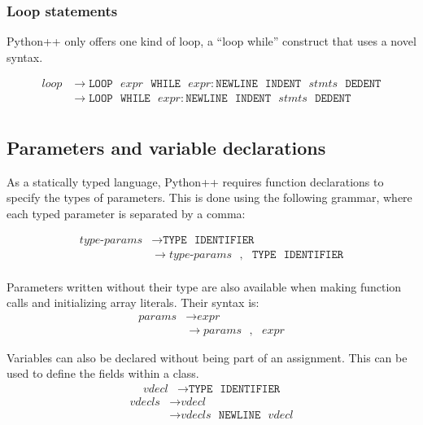 \documentclass{article}
\begin{document}
\subsubsection{Loop statements}
Python++ only offers one kind of loop, a ``loop while'' construct that uses a novel syntax.

\label{sec:loop}
\begin{align*}
    \textit{loop} &\to \texttt{LOOP} \texttt{ } \hyperref[sec:expr]{\textit{expr}} \texttt{ } \texttt{WHILE} \texttt{ } \hyperref[sec:expr]{\textit{expr}}: \texttt{NEWLINE} \texttt{ } \texttt{INDENT} \texttt{ } \hyperref[sec:stmts]{\textit{stmts}} \texttt{ } \texttt{DEDENT} \\
    &\to \texttt{LOOP} \texttt{ } \texttt{WHILE} \texttt{ } \hyperref[sec:expr]{\textit{expr}}: \texttt{NEWLINE} \texttt{ } \texttt{INDENT} \texttt{ } \hyperref[sec:stmts]{\textit{stmts}} \texttt{ } \texttt{DEDENT} \\
\end{align*}

\subsection{Parameters and variable declarations}
As a statically typed language, Python++ requires function declarations to specify the types of parameters. This is done using the following grammar, where each typed parameter is separated by a comma:

\label{sec:type-params}
\begin{align*}
    \textit{type-params} &\to \texttt{TYPE} \texttt{ } \texttt{IDENTIFIER} \\
    &\to \hyperref[sec:type-params]{\textit{type-params}} \texttt{ }, \texttt{ } \texttt{TYPE} \texttt{ } \texttt{IDENTIFIER} \\
\end{align*}

Parameters written without their type are also available when making function calls and initializing array literals. Their syntax is:
\label{sec:params}
\begin{align*}
    \textit{params} &\to \hyperref[sec:expr]{\textit{expr}} \\
    &\to \hyperref[sec:params]{\textit{params}} \texttt{ } , \texttt{ } \hyperref[sec:expr]{\textit{expr}}
\end{align*}

Variables can also be declared without being part of an assignment. This can be used to define the fields within a class.
\label{sec:vdecl}
\begin{align*}
    \textit{vdecl} &\to \texttt{TYPE} \texttt{ } \texttt{IDENTIFIER}
\end{align*}
\label{sec:vdecls}
\begin{align*}
    \textit{vdecls} &\to \hyperref[sec:vdecl]{\textit{vdecl}} \\ &\to \hyperref[sec:vdecls]{\textit{vdecls}} \texttt{ } \texttt{NEWLINE} \texttt{ } \hyperref[sec:vdecl]{\textit{vdecl}}
\end{align*}
\end{document}

